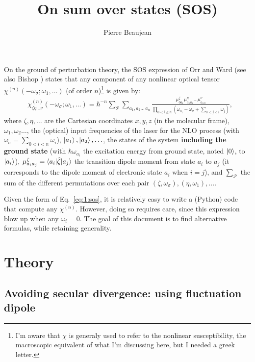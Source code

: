 \documentclass[12pt,a4paper]{article}
\title{On sum over states (SOS)}
\author{Pierre Beaujean}
\begin{document}
\maketitle

\allowdisplaybreaks
\onehalfspacing

On the ground of perturbation theory, 
the SOS expression of Orr and Ward \cite{orrPerturbationTheoryNonlinear1971} (see also Bishop \cite{bishopExplicitNondivergentFormulas1994}) states that any component of any nonlinear optical tensor $\chi^{(n)}(-\omega_\sigma;\omega_1,\ldots)$ (of order $n$)\footnote{I'm aware that $\chi$ is generaly used to refer to the nonlinear susceptibility, the macroscopic equivalent of what I'm discussing here, but I needed a greek letter.} is given by:\begin{align}
&\chi^{(n)}_{\zeta\eta\ldots\nu}(-\omega_\sigma;\omega_1,\ldots) = \hbar^{-n}\sum_\mathcal{P}\sum_{a_1,a_2\ldots\,a_{n}} \frac{\mu^\zeta_{0a_1}{\mu}^\eta_{a_1a_2}\ldots \mu^\nu_{a_{n\,0}}}{\prod_{0<i\leq n} (\omega_{a_i}-\omega_\sigma+\sum_{0<j<i} \omega_j)},\label{eq:1:sos}
\end{align}
where $\zeta,\eta,\ldots$ are the Cartesian coordinates $x, y, z$ (in the molecular frame), $\omega_1, \omega_2\ldots$, the (optical) input frequencies of the laser for the NLO process (with $\omega_\sigma = \sum_{0<i<n} \omega_i$), $\ket{a_1}, \ket{a_2}, \ldots$, the states of the system  \textbf{including the ground state} (with $\hbar\omega_{a_i}$ the excitation energy from ground state, noted  $\ket{0}$, to $\ket{a_i}$), $\mu^\zeta_{a_ia_j} = \braket{a_i|\hat \zeta|a_j}$ the transition dipole moment from state $a_i$ to $a_j$ (it corresponds to the dipole moment of electronic state $a_i$ when $i=j$), and $\sum_\mathcal{P}$ the sum of the different permutations over each pair $(\zeta, \omega_\sigma),(\eta,\omega_1),\ldots$. 

Given the form of Eq.~\eqref{eq:1:sos}, it is relatively easy to write a (Python) code that compute any $\chi^{(n)}$. However, doing so requires care, since this expression blow up when any $\omega_i = 0$. The goal of this document is to find alternative formulas, while retaining generality.

\section{Theory}

\subsection{Avoiding secular divergence: using fluctuation dipole}
\end{document}
